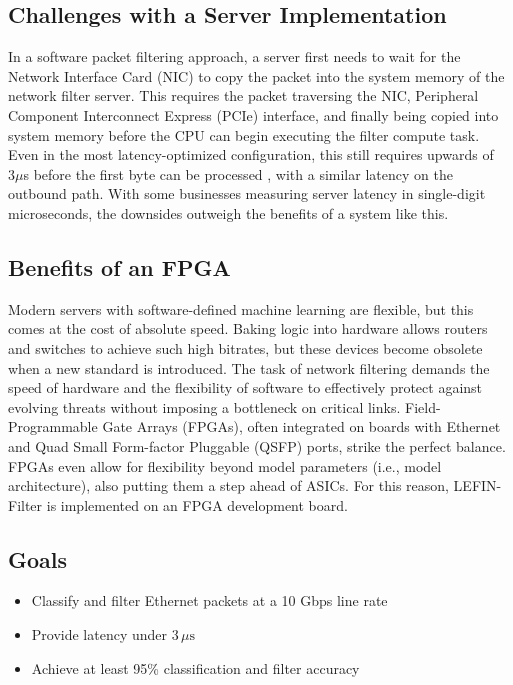 \documentclass[conference]{IEEEtran}
\begin{document}
\subsection{Challenges with a Server Implementation}
In a software packet filtering approach,
a server first needs to wait for the
Network Interface Card (NIC) to copy the packet into
the system memory of the network filter server.
This requires the packet traversing the NIC,
Peripheral Component Interconnect Express (PCIe)
interface, and finally being copied into system memory
before the CPU can begin executing the filter compute task.
Even in the most latency-optimized configuration,
this still requires upwards of $3\mu$s before the
first byte can be processed \cite{paper-ix-os, paper-neugebauer}, with a similar latency on the outbound path. With some businesses measuring server latency in single-digit microseconds, the downsides outweigh the benefits of a system like this.

\subsection{Benefits of an FPGA}
Modern servers with software-defined machine learning are flexible, but this comes at the cost of absolute speed. Baking logic into hardware allows routers and switches to achieve such high bitrates, but these devices become obsolete when a new standard is introduced. The task of network filtering demands the speed of hardware and the flexibility of software to effectively protect against evolving threats without imposing a bottleneck on critical links. Field-Programmable Gate Arrays (FPGAs), often integrated on boards with Ethernet and Quad Small Form-factor Pluggable (QSFP) ports, strike the perfect balance. FPGAs even allow for flexibility beyond model parameters (i.e., model architecture), also putting them a step ahead of ASICs. For this reason, LEFIN-Filter is implemented on an FPGA development board.

\subsection{Goals}
\begin{itemize}
    \item Classify and filter Ethernet packets at a 10 Gbps line rate
    \item Provide latency under $3\,\mu\text{s}$
    \item Achieve at least 95\% classification and filter accuracy
\end{itemize}
\end{document}
